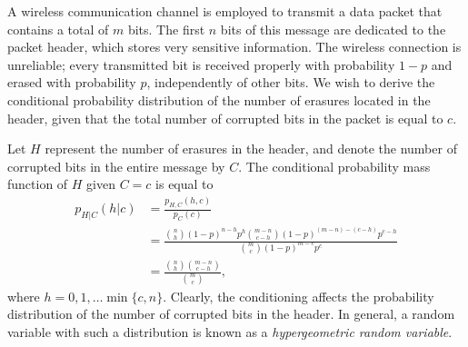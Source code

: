 \begin{example}
A wireless communication channel is employed to transmit a data packet that contains a total of $m$ bits.
The first $n$ bits of this message are dedicated to the packet header, which stores very sensitive information.
The wireless connection is unreliable; every transmitted bit is received properly with probability $1-p$ and erased with probability $p$, independently of other bits.
We wish to derive the conditional probability distribution of the number of erasures located in the header, given that the total number of corrupted bits in the packet is equal to $c$.

Let $H$ represent the number of erasures in the header, and denote the number of corrupted bits in the entire message by $C$.
The conditional probability mass function of $H$ given $C = c$ is equal to
\begin{equation*}
\begin{split}
p_{H|C} (h|c) &= \frac{p_{H,C} (h,c)}{p_C (c)} \\
&= \frac{\binom{n}{h} (1-p)^{n-h} p^h
\binom{m-n}{c-h} (1-p)^{(m-n)-(c-h)} p^{c - h}}{\binom{m}{c} (1-p)^{m-c} p^c} \\
&= \frac{\binom{n}{h} \binom{m-n}{c-h}}{\binom{m}{c}} ,
\end{split}
\end{equation*}
where $h = 0, 1, \ldots \min \{ c, n \}$.
Clearly, the conditioning affects the probability distribution of the number of corrupted bits in the header.
In general, a random variable with such a distribution is known as a \emph{hypergeometric random variable}. 
\end{example}

